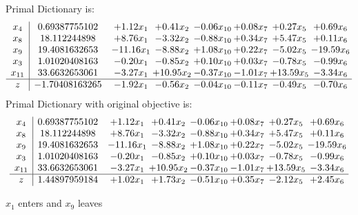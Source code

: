 \documentclass[8pt]{article}
\begin{document}
Primal Dictionary is:
\[\begin{array}{c| c c@{\hskip 2pt} c@{\hskip 2pt} c@{\hskip 2pt} c@{\hskip 2pt} c@{\hskip 2pt} c@{\hskip 2pt} }
 x_{4}   &  0.69387755102 & +  1.12 x_{1} & +  0.41 x_{2} & -0.06 x_{10} & +  0.08 x_{7} & +  0.27 x_{5} & +  0.69 x_{6}\\
 x_{8}   &  18.112244898 & +  8.76 x_{1} & -3.32 x_{2} & -0.88 x_{10} & +  0.34 x_{7} & +  5.47 x_{5} & +  0.11 x_{6}\\
 x_{9}   &  19.4081632653 & -11.16 x_{1} & -8.88 x_{2} & +  1.08 x_{10} & +  0.22 x_{7} & -5.02 x_{5} & -19.59 x_{6}\\
 x_{3}   &  1.01020408163 & -0.20 x_{1} & -0.85 x_{2} & +  0.10 x_{10} & +  0.03 x_{7} & -0.78 x_{5} & -0.99 x_{6}\\
 x_{11}   &  33.6632653061 & -3.27 x_{1} & + 10.95 x_{2} & -0.37 x_{10} & -1.01 x_{7} & + 13.59 x_{5} & -3.34 x_{6}\\
\hline
z    &  -1.70408163265 & -1.92 x_{1} & -0.56 x_{2} & -0.04 x_{10} & -0.11 x_{7} & -0.49 x_{5} & -0.70 x_{6}\\
\end{array}\]
Primal Dictionary with original objective is:
\[\begin{array}{c| c c@{\hskip 2pt} c@{\hskip 2pt} c@{\hskip 2pt} c@{\hskip 2pt} c@{\hskip 2pt} c@{\hskip 2pt} }
 x_{4}   &  0.69387755102 & +  1.12 x_{1} & +  0.41 x_{2} & -0.06 x_{10} & +  0.08 x_{7} & +  0.27 x_{5} & +  0.69 x_{6}\\
 x_{8}   &  18.112244898 & +  8.76 x_{1} & -3.32 x_{2} & -0.88 x_{10} & +  0.34 x_{7} & +  5.47 x_{5} & +  0.11 x_{6}\\
 x_{9}   &  19.4081632653 & -11.16 x_{1} & -8.88 x_{2} & +  1.08 x_{10} & +  0.22 x_{7} & -5.02 x_{5} & -19.59 x_{6}\\
 x_{3}   &  1.01020408163 & -0.20 x_{1} & -0.85 x_{2} & +  0.10 x_{10} & +  0.03 x_{7} & -0.78 x_{5} & -0.99 x_{6}\\
 x_{11}   &  33.6632653061 & -3.27 x_{1} & + 10.95 x_{2} & -0.37 x_{10} & -1.01 x_{7} & + 13.59 x_{5} & -3.34 x_{6}\\
\hline
z    &  1.44897959184 & +  1.02 x_{1} & +  1.73 x_{2} & -0.51 x_{10} & +  0.35 x_{7} & -2.12 x_{5} & +  2.45 x_{6}\\
\end{array}\]


 $ x_{1} $ enters and $ x_{9} $ leaves 
\end{document}
